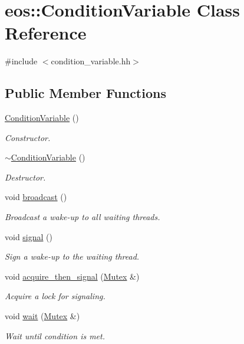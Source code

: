 \hypertarget{classeos_1_1ConditionVariable}{
\section{eos::ConditionVariable Class Reference}
\label{classeos_1_1ConditionVariable}
}


{\ttfamily \#include $<$condition\_\-variable.hh$>$}\subsection*{Public Member Functions}
\begin{DoxyCompactItemize}
\item 
\hyperlink{classeos_1_1ConditionVariable_a64b2350d3ef0bf6c58f0f063da7a4ea4}{ConditionVariable} ()
\begin{DoxyCompactList}\small\item\em Constructor. \item\end{DoxyCompactList}\item 
\hyperlink{classeos_1_1ConditionVariable_abf981bbbce2e09c235d461f7aea14479}{$\sim$ConditionVariable} ()
\begin{DoxyCompactList}\small\item\em Destructor. \item\end{DoxyCompactList}\item 
void \hyperlink{classeos_1_1ConditionVariable_a353db40ed7ea89d107627a4f32b829fe}{broadcast} ()
\begin{DoxyCompactList}\small\item\em Broadcast a wake-\/up to all waiting threads. \item\end{DoxyCompactList}\item 
void \hyperlink{classeos_1_1ConditionVariable_a58e81670564c2096dcfdbf34dba8f4a4}{signal} ()
\begin{DoxyCompactList}\small\item\em Sign a wake-\/up to the waiting thread. \item\end{DoxyCompactList}\item 
void \hyperlink{classeos_1_1ConditionVariable_adc82f6f8edc7d82776fe183d7f647d2c}{acquire\_\-then\_\-signal} (\hyperlink{classeos_1_1Mutex}{Mutex} \&)
\begin{DoxyCompactList}\small\item\em Acquire a lock for signaling. \item\end{DoxyCompactList}\item 
void \hyperlink{classeos_1_1ConditionVariable_a42313d0ec24908e952f8b675a966a6a6}{wait} (\hyperlink{classeos_1_1Mutex}{Mutex} \&)
\begin{DoxyCompactList}\small\item\em Wait until condition is met. \item\end{DoxyCompactList}\end{DoxyCompactItemize}


